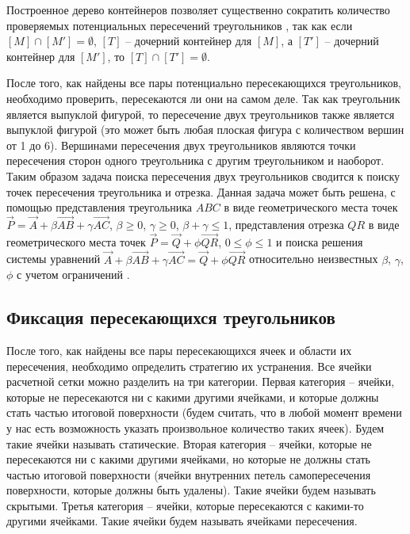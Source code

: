 Построенное дерево контейнеров позволяет существенно сократить количество проверяемых потенциальных пересечений треугольников \cite{Jung}, так как если $[M] \cap [M'] = \emptyset$, $[T]$ -- дочерний контейнер для $[M]$, а $[T']$ -- дочерний контейнер для $[M']$, то $[T] \cap [T'] = \emptyset$.

После того, как найдены все пары потенциально пересекающихся треугольников, необходимо проверить, пересекаются ли они на самом деле.
Так как треугольник является выпуклой фигурой, то пересечение двух треугольников также является выпуклой фигурой (это может быть любая плоская фигура с количеством вершин от 1 до 6).
Вершинами пересечения двух треугольников являются точки пересечения сторон одного треугольника с другим треугольником и наоборот.
Таким образом задача поиска пересечения двух треугольников сводится к поиску точек пересечения треугольника и отрезка.
Данная задача может быть решена, с помощью представления треугольника $ABC$ в виде геометрического места точек $\vec{P} = \vec{A} + \beta \vec{AB} + \gamma \vec{AC}$, $\beta \ge 0$, $\gamma \ge 0$, $\beta + \gamma \le 1$, представления отрезка $QR$ в виде геометрического места точек $\vec{P} = \vec{Q} + \phi \vec{QR}$, $0 \le \phi \le 1$ и поиска решения системы уравнений $\vec{A} + \beta \vec{AB} + \gamma \vec{AC} = \vec{Q} + \phi \vec{QR}$ относительно неизвестных $\beta$, $\gamma$, $\phi$ с учетом ограничений \cite{Freylekhman}.

\subsection{Фиксация пересекающихся треугольников}

После того, как найдены все пары пересекающихся ячеек и области их пересечения, необходимо определить стратегию их устранения.
Все ячейки расчетной сетки можно разделить на три категории.
Первая категория -- ячейки, которые не пересекаются ни с какими другими ячейками, и которые должны стать частью итоговой поверхности (будем считать, что в любой момент времени у нас есть возможность указать произвольное количество таких ячеек).
Будем такие ячейки называть статические.
Вторая категория -- ячейки, которые не пересекаются ни с какими другими ячейками, но которые не должны стать частью итоговой поверхности (ячейки внутренних петель самопересечения поверхности, которые должны быть удалены).
Такие ячейки будем называть скрытыми.
Третья категория -- ячейки, которые пересекаются с какими-то другими ячейками. 
Такие ячейки будем называть ячейками пересечения.

